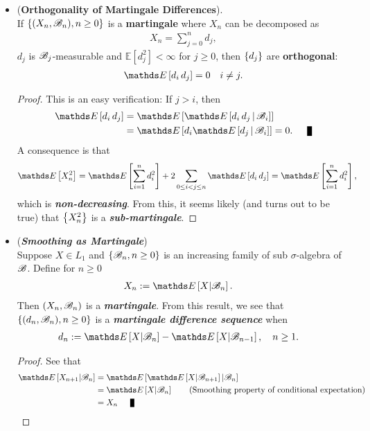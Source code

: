 \documentclass[11pt]{article}
\begin{document}
\begin{itemize}
\item \begin{proposition} (\textbf{Orthogonality of Martingale Differences}). \citep{resnick2013probability}\\
If $\left\{(X_n, {\mathscr B}_n), n \ge 0\right\}$ is a \textbf{martingale} where $X_n$ can be decomposed as
\begin{align*}
X_n = \sum_{j=0}^{n} d_j, 
\end{align*}  $d_j$ is ${\mathscr B}_j$-measurable and  $\mathds{E}[d_j^2] < \infty$ for $j \ge 0$, then $\left\{d_j\right\}$ are \textbf{orthogonal}:
\begin{align*}
\E{}{d_i\,d_j} = 0 \quad i \neq j.
\end{align*}
\end{proposition}
\begin{proof}
This is an easy verification: If $j > i$, then
\begin{align*}
\E{}{d_i\, d_j} &= \E{}{\E{}{d_i\, d_j \,|\, \srB_i}}\\
&= \E{}{d_i \E{}{d_j \,|\, \srB_i}} = 0. \qed
\end{align*}
A consequence is that
\begin{align*}
\E{}{X_n^2} &= \E{}{\sum_{i=1}^{n}d_i^2} + 2\sum_{0 \le i < j \le n}\E{}{d_i\,d_j} = \E{}{\sum_{i=1}^{n}d_i^2},
\end{align*}
which is \textbf{\emph{non-decreasing}}. From this, it seems likely (and turns out to be true) that $\left\{X_n^2\right\}$ is a \emph{\textbf{sub-martingale}}. 
\end{proof}

\item \begin{example} (\textbf{\emph{Smoothing as Martingale}})\\
Suppose $X \in L_1$ and $\left\{{\mathscr B}_n, n \ge 0\right\}$ is an increasing family of sub $\sigma$-algebra of ${\mathscr B}$. Define for $n \ge 0$
\begin{align*}
X_n &:= \E{}{X | \srB_n}.
\end{align*}
Then $(X_n, {\mathscr B}_n)$ is a \emph{\textbf{martingale}}. From this result, we see that $\left\{(d_n, {\mathscr B}_n), n \ge 0\right\}$ is a \emph{\textbf{martingale difference sequence}} when 
\begin{align}
d_n &:= \E{}{X | \srB_n} - \E{}{X | \srB_{n-1}}, \quad n\ge 1. \label{eqn: smoothing_martingale_difference}
\end{align}
\end{example}
\begin{proof}
See that 
\begin{align*}
\E{}{X_{n+1} | \srB_{n}} &= \E{}{ \E{}{X | \srB_{n+1}} | \srB_n} \\
&= \E{}{X | \srB_{n}}  \qquad \text{(Smoothing property of conditional expectation)}\\
&= X_n \qed
\end{align*} 
\end{proof}


\end{itemize}
\end{document}
